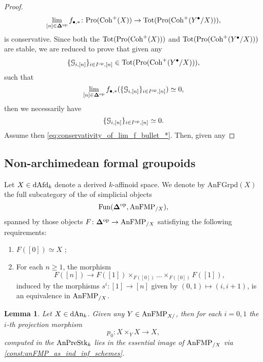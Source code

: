 \documentclass[10pt,a4paper,reqno]{amsart} %
\theoremstyle{plain}
\newtheorem{lem}[thm]{Lemma}
\theoremstyle{definition}
\theoremstyle{remark}
\numberwithin{equation}{section}
\begin{document}
\begin{proof}
        \[
            \lim_{[n] \in \bm{\Delta} ^\mathrm{op}} f_{\bullet, *} \colon \mathrm{Pro}(\mathrm{Coh}^+(X)) \to \mathrm{Tot}(\mathrm{Pro}(\mathrm{Coh}^+(Y^\bullet/X))),  
        \]
    is conservative. Since both the \infcats $\mathrm{Tot}(\mathrm{Pro}(\mathrm{Coh}^+(X)))$ and $\mathrm{Tot}(\mathrm{Pro}(\mathrm{Coh}^+(Y^\bullet/X)))$ are stable, we are reduced to prove that given any
        \[
            \{ \mathcal G_{i, [n]} \}_{i \in I^\mathrm{op}, [n]} \in \mathrm{Tot}(\mathrm{Pro}(\mathrm{Coh}^+(Y^\bullet/X))),  
        \]
    such that 
        \begin{equation} \label{eq:conservativity_of_lim_f_bullet_*}
            \lim_{[n] \in \bm{\Delta} ^\mathrm{op}} f_{\bullet, *}( \{ \mathcal G_{i, [n]} \}_{i \in I^\mathrm{op}, [n]})  \simeq 0,
        \end{equation}
    then we necessarily have
        \[
            \{ \mathcal G_{i, [n]} \}_{i \in I^\mathrm{op}, [n]} \simeq 0  .
        \]
    Assume then \cref{eq:conservativity_of_lim_f_bullet_*}. Then, given any 
\end{proof}

\subsection{Non-archimedean formal groupoids}
Let $X \in \mathrm{dAfd}_k$ denote a derived $k$-affinoid space. We denote by
$\mathrm{AnFGrpd}(X)$ the full subcategory of the \infcat of simplicial objects
    \[
        \operatorname{Fun}( \bm{\Delta} ^\mathrm{op}, \mathrm{AnFMP}_{/X}),
    \]
spanned by those objects $F \colon \mathbf \Delta ^\mathrm{op} \to \mathrm{AnFMP}_{/X}$ satisfiying the following requirements:
    \begin{enumerate}
        \item $F([0]) \simeq X$ ;
        \item For each $n \ge 1$, the morphism
            \[
                F([n]) \to F([1]) \times_{F([0])} \dots \times_{F([0])} F([1])  ,
            \]
        induced by the morphisms $s^i \colon [1] \to [n]$ given by $(0,1) \mapsto (i, i+1)$, is an equivalence
        in $\mathrm{AnFMP}_{/X}$.
    \end{enumerate}

\begin{lem} \label{formal_moduli_under_induce_formal_moduli_over_via_base_change}
    Let $X \in \mathrm{dAn}_k$. Given any $Y \in \mathrm{AnFMP}_{X/ }$, then for each $i= 0, 1$ the $i$-th projection morphism
        \[
            p_0 \colon X \times_Y X \to X,  
        \]
    computed in the \infcat $\mathrm{AnPreStk}_k$ lies in the essential image of $\mathrm{AnFMP}_{/X}$ via \cref{const:anFMP_as_ind_inf_schemes}.
\end{lem}
\end{document}
